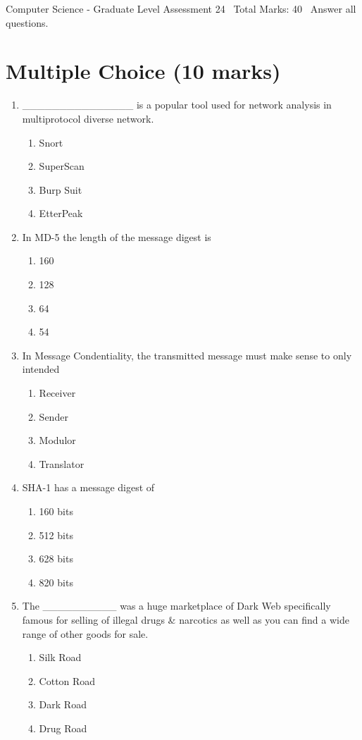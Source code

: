 \documentclass[12pt]{article}
\begin{document}
\begin{center}
Computer Science - Graduate Level Assessment 24 \
Total Marks: 40 \
Answer all questions.
\end{center}

\section*{Multiple Choice (10 marks)}
\begin{enumerate}[label=\arabic*.]
\item \_\_\_\_\_\_\_\_\_\_\_\_\_\_\_ is a popular tool used for network analysis in multiprotocol diverse network.
\begin{enumerate}[label=(\alph*)]
    \item Snort
    \item SuperScan
    \item Burp Suit
    \item EtterPeak
\end{enumerate}
\item In MD-5 the length of the message digest is
\begin{enumerate}[label=(\alph*)]
    \item 160
    \item 128
    \item 64
    \item 54
\end{enumerate}
\item In Message Condentiality, the transmitted message must make sense to only intended
\begin{enumerate}[label=(\alph*)]
    \item Receiver
    \item Sender
    \item Modulor
    \item Translator
\end{enumerate}
\item SHA-1 has a message digest of
\begin{enumerate}[label=(\alph*)]
    \item 160 bits
    \item 512 bits
    \item 628 bits
    \item 820 bits
\end{enumerate}
\item The \_\_\_\_\_\_\_\_\_\_ was a huge marketplace of Dark Web specifically famous for selling of illegal drugs \& narcotics as well as you can find a wide range of other goods for sale.
\begin{enumerate}[label=(\alph*)]
    \item Silk Road
    \item Cotton Road
    \item Dark Road
    \item Drug Road
\end{enumerate}
\end{enumerate}
\end{document}
